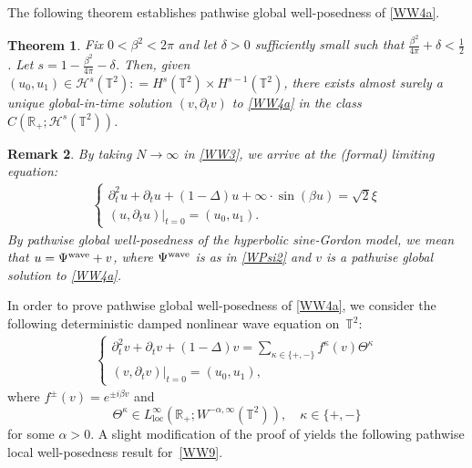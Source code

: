 \documentclass[letterpaper, 11pt,  reqno]{amsart}
\newtheorem{theorem}{Theorem} [section]
\newtheorem{proposition}[theorem]{Proposition}
\theoremstyle{myremark}
\newtheorem{remark}[theorem]{Remark}
\newcommand{\Ta}{\Theta}
\newcommand{\1}{\hspace{0.5mm}\text{I}\hspace{0.5mm}}
\newcommand{\I}{\mathcal{I}}
\newcommand{\R}{\mathbb{R}}
\newcommand{\T}{\mathbb{T}}
\let\Im=\undefined\DeclareMathOperator*{\Im}{Im}
\newcommand{\al}{\alpha}
\newcommand{\be}{\beta}
\newcommand{\dl}{\delta}
\newcommand{\Dl}{\Delta}
\newcommand{\kk}{\kappa}
\newcommand{\dt}{\partial_t}
\renewcommand{\H}{\mathcal{H}}
\newcommand{\wave}{\textup{wave}}
\numberwithin{equation}{section}
\numberwithin{theorem}{section}
\begin{document}
The following  theorem establishes 
pathwise global well-posedness of \eqref{WW4a}.



\begin{theorem}\label{THM:GWP}
Fix $0 < \be^2 < 2\pi$ and let $\dl > 0$ sufficiently small such that 
$\frac{\be^2}{4\pi} + \dl < \frac 12$.
Let $s = 1- \frac{\be^2}{4\pi} - \dl $.
Then, given 
 $(u_0, u_1) \in \H^s(\T^2)
: = H^s(\T^2) \times H^{s-1}(\T^2)$, 
there exists almost surely a unique global-in-time solution 
$(v, \dt v)$ to \eqref{WW4a}
in the class 
$C(\R_+;\H^{s}(\T^2))$.


\end{theorem}



\begin{remark}
By taking $N \to \infty$ in \eqref{WW3}, 
we arrive at
 the (formal) limiting equation:
\begin{align*}
\begin{cases}
\dt^2 u + \dt u + (1- \Dl)  u   +  \infty \cdot \sin(\be  u) = \sqrt{2} \xi\\
(u, \dt u) |_{t = 0} = (u_0, u_1).
\end{cases}
\end{align*}
By pathwise global well-posedness
of the hyperbolic sine-Gordon model, 
we mean that $u = \Psi^\wave + v$, 
where $\Psi^\wave$ is as in  \eqref{WPsi2}
and $v$ is a pathwise global solution to \eqref{WW4a}.
\end{remark}


%
	





%
%
%




In order to  prove pathwise global well-posedness
of \eqref{WW4a}, 
we consider  the following deterministic damped nonlinear wave equation on~$\T^2$:
\begin{align}
\begin{cases}
\dt^2 v + \dt v + (1- \Dl) v = \sum_{\kk \in \{+, -\}} f^\kk(v) \Ta^\kk \\
(v, \dt v) |_{t = 0} = (u_0, u_1),  %
\end{cases}
\label{WW9}
\end{align}
where $f^\pm(v) = e^{\pm i \be v}$
and 
\[ \Ta^\kk\in 
L^\infty_\text{loc}(\R_+;W^{-\al,\infty}(\T^2)), \quad \kk \in \{+, -\}\]
for some  
 $\al > 0$. 
A slight modification of the proof of \cite[Proposition 3.1]{ORSW}
yields the following pathwise local well-posedness result  for~\eqref{WW9}.
\end{document}
